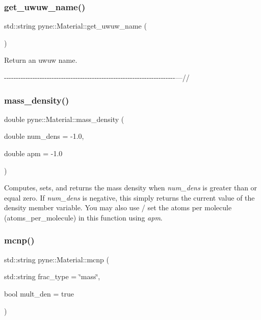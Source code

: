 \subsubsection{\texorpdfstring{get\+\_\+uwuw\+\_\+name()}{get\_uwuw\_name()}}
{\footnotesize\ttfamily std\+::string pyne\+::\+Material\+::get\+\_\+uwuw\+\_\+name (\begin{DoxyParamCaption}{ }\end{DoxyParamCaption})}



Return an uwuw name. 

-\/-\/-\/-\/-\/-\/-\/-\/-\/-\/-\/-\/-\/-\/-\/-\/-\/-\/-\/-\/-\/-\/-\/-\/-\/-\/-\/-\/-\/-\/-\/-\/-\/-\/-\/-\/-\/-\/-\/-\/-\/-\/-\/-\/-\/-\/-\/-\/-\/-\/-\/-\/-\/-\/-\/-\/-\/-\/-\/-\/-\/-\/-\/-\/-\/-\/-\/-\/-\/-\/-\/-\/---// \mbox{\label{classpyne_1_1_material_ac5bbc836d8b9042297444c51506b7439}} 
\subsubsection{\texorpdfstring{mass\+\_\+density()}{mass\_density()}}
{\footnotesize\ttfamily double pyne\+::\+Material\+::mass\+\_\+density (\begin{DoxyParamCaption}\item[{double}]{num\+\_\+dens = {\ttfamily -\/1.0},  }\item[{double}]{apm = {\ttfamily -\/1.0} }\end{DoxyParamCaption})}

Computes, sets, and returns the mass density when {\itshape num\+\_\+dens} is greater than or equal zero. If {\itshape num\+\_\+dens} is negative, this simply returns the current value of the density member variable. You may also use / set the atoms per molecule (atoms\+\_\+per\+\_\+molecule) in this function using {\itshape apm}. \mbox{\label{classpyne_1_1_material_a3578549b31e08e6fdf32fd07b1b2ca49}} 
\subsubsection{\texorpdfstring{mcnp()}{mcnp()}}
{\footnotesize\ttfamily std\+::string pyne\+::\+Material\+::mcnp (\begin{DoxyParamCaption}\item[{std\+::string}]{frac\+\_\+type = {\ttfamily \char`\"{}mass\char`\"{}},  }\item[{bool}]{mult\+\_\+den = {\ttfamily true} }\end{DoxyParamCaption})}



